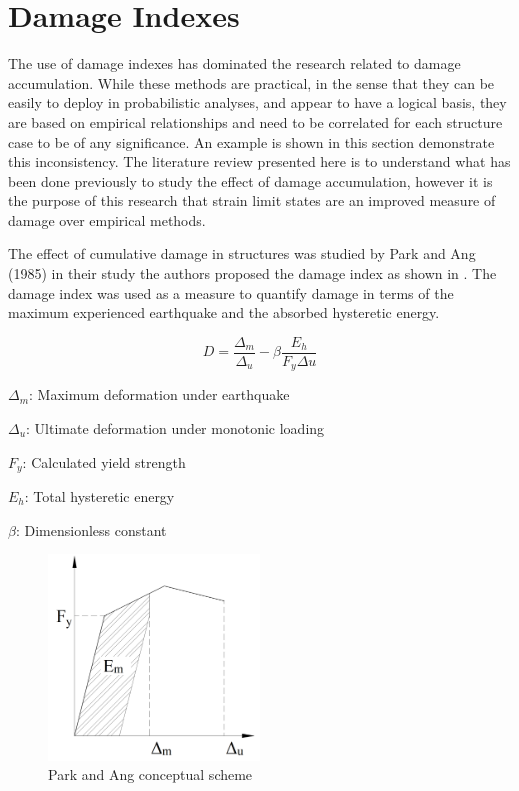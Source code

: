 \newpage

\section{Damage Indexes}
The use of damage indexes has dominated the research related to damage accumulation. While these methods are practical, in the sense that they can be easily to deploy in probabilistic analyses, and appear to have a logical basis, they are based on empirical relationships and need to be correlated for each structure case to be of any significance. An example is shown in this section demonstrate this inconsistency.  The literature review presented here is to understand what has been done previously to study the effect of damage accumulation, however it is the purpose of this research that strain limit states are an improved measure of damage over empirical methods.

The effect of cumulative damage in structures was studied by Park and Ang (1985) \cite{Young-JiPark1985} in their study the authors proposed the damage index as shown in . The damage index was used as a measure to quantify damage in terms of the maximum experienced earthquake and the absorbed hysteretic energy.

\begin{equation}
  D=\frac{\Delta_{m}}{\Delta_{u}}-\beta \frac{E_h}{F_{y}\Delta{u}}
  \label{eq.DamageIndex}
\end{equation} 

$\Delta_{m}$: Maximum deformation under earthquake

$\Delta_{u}$: Ultimate deformation under monotonic loading

$F_{y}$: Calculated yield strength

$E_{h}$: Total hysteretic energy

$\beta$: Dimensionless constant 

\begin{figure}[htbp]
\centering
\includegraphics[width=0.50\textwidth]{Chapter-2/figs/Park_and_Ang_Model}
\caption{Park and Ang conceptual scheme}
\label{fig:Paa}
\end{figure}

